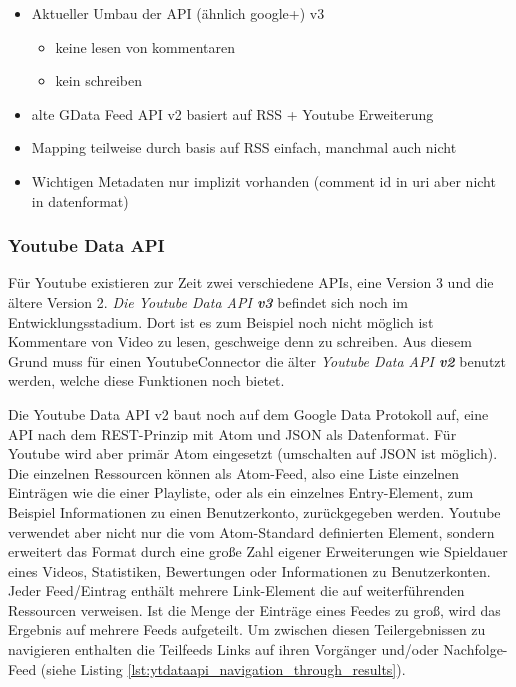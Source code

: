\begin{itemize}
    \item Aktueller Umbau der API (ähnlich google+) v3
    \begin{itemize}
        \item keine lesen von kommentaren
        \item kein schreiben
    \end{itemize}
    \item alte GData Feed API v2 basiert auf RSS + Youtube Erweiterung
    \item Mapping teilweise durch basis auf RSS einfach, manchmal auch nicht
    \item Wichtigen Metadaten nur implizit vorhanden (comment id in uri aber nicht in datenformat)
\end{itemize}

\subsubsection{Youtube Data API} %
\label{ssub:youtube_data_api}

Für Youtube existieren zur Zeit zwei verschiedene APIs, eine Version 3 und die ältere Version 2. \emph{Die Youtube Data API \textbf{v3}} befindet sich noch im Entwicklungsstadium. Dort ist es zum Beispiel noch nicht möglich ist Kommentare von Video zu lesen, geschweige denn zu schreiben. Aus diesem Grund muss für einen YoutubeConnector die älter \emph{Youtube Data API \textbf{v2}} benutzt werden, welche diese Funktionen noch bietet. 

Die Youtube Data API v2 baut noch auf dem Google Data Protokoll auf, eine API nach dem REST-Prinzip mit Atom und JSON als Datenformat. Für Youtube wird aber primär Atom eingesetzt (umschalten auf JSON ist möglich). Die einzelnen Ressourcen können als Atom-Feed, also eine Liste einzelnen Einträgen wie die einer Playliste, oder als ein einzelnes Entry-Element, zum Beispiel Informationen zu einen Benutzerkonto, zurückgegeben werden. Youtube verwendet aber nicht nur die vom Atom-Standard definierten Element, sondern erweitert das Format durch eine große Zahl eigener Erweiterungen wie Spieldauer eines Videos, Statistiken, Bewertungen oder Informationen zu Benutzerkonten. Jeder Feed/Eintrag enthält mehrere Link-Element die auf weiterführenden Ressourcen verweisen. Ist die Menge der Einträge eines Feedes zu groß, wird das Ergebnis auf mehrere Feeds aufgeteilt. Um zwischen diesen Teilergebnissen zu navigieren enthalten die Teilfeeds Links auf ihren Vorgänger und/oder Nachfolge-Feed (siehe Listing \ref{lst:ytdataapi_navigation_through_results}).

